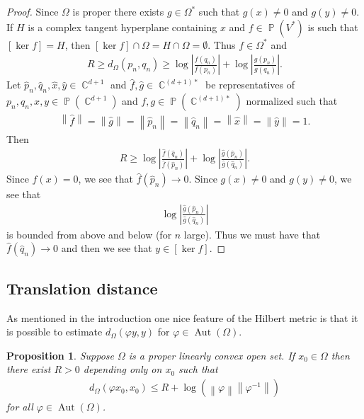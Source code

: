 \documentclass[12pt]{amsart}
\theoremstyle{plain}
\newtheorem{proposition}{Proposition}[section]
\theoremstyle{definition}
\theoremstyle{remark}
\begin{document}
\begin{proof}
Since $\Omega$ is proper there exists $g \in \Omega^*$ such that $g(x) \neq 0$ and $g(y) \neq 0$. If $H$ is a complex tangent hyperplane containing $x$ and $f \in\operatorname{\mathbb{P}}(V^*)$ is such that $[\ker f]=H$, then $[\ker f] \cap \Omega = H \cap \Omega = \emptyset$. Thus $f \in \Omega^*$ and 
\begin{align*}
R \geq d_{\Omega}( p_n, q_n ) \geq \log {\left|{ \frac{f(q_n)}{f(p_n)}}\right|}+\log  {\left|{\frac{g(p_n)}{g(q_n)}}\right|}.
\end{align*}
Let $\hat{p}_n,\hat{q}_n,\hat{x},\hat{y} \in \operatorname{\mathbb{C}}^{d+1}$ and $\hat{f},\hat{g} \in \operatorname{\mathbb{C}}^{(d+1)*}$ be representatives of $p_n,q_n,x,y \in \operatorname{\mathbb{P}}(\operatorname{\mathbb{C}}^{d+1})$ and $f,g \in \operatorname{\mathbb{P}}(\operatorname{\mathbb{C}}^{(d+1)*})$ normalized such that 
\begin{align*}
{\left\|{\hat{f}}\right\|}={\left\|{\hat{g}}\right\|}={\left\|{\hat{p}_n}\right\|}={\left\|{\hat{q}_n}\right\|}={\left\|{\hat{x}}\right\|}={\left\|{\hat{y}}\right\|}=1.
\end{align*}
Then 
\begin{align*}
R \geq \log {\left|{\frac{\hat{f}(\hat{q}_n)}{\hat{f}(\hat{p}_n)}}\right|}+\log {\left|{ \frac{\hat{g}(\hat{p}_n)}{\hat{g}(\hat{q}_n)}}\right|}.
\end{align*}
Since $f(x)=0$, we see that $\hat{f}(\hat{p}_n) \rightarrow 0$. Since $g(x) \neq 0$ and $g(y) \neq 0$, we see that 
\begin{align*}
\log  {\left|{\frac{\hat{g}(\hat{p}_n)}{\hat{g}(\hat{q}_n)}}\right|}
\end{align*}
 is bounded from above and below (for $n$ large). Thus we must have that $\hat{f}(\hat{q}_n) \rightarrow 0$ and then we see that $y \in [\ker f]$.
\end{proof}

\subsection{Translation distance} As mentioned in the introduction one nice feature of the Hilbert metric is that it is possible to estimate $d_{\Omega} (\varphi y, y)$ for $\varphi \in \operatorname{Aut}(\Omega)$. 

\begin{proposition}
\label{prop:trans_dist}
Suppose $\Omega$ is a  proper linearly convex open set. If $x_0 \in \Omega$ then there exist $R>0$ depending only on $x_0$ such that 
\begin{align*}
d_{\Omega}(\varphi x_0, x_0) \leq R + \log\left({\left\|{\varphi}\right\|}{\left\|{\varphi^{-1}}\right\|}\right)
\end{align*}
for all $\varphi \in \operatorname{Aut}(\Omega)$.
\end{proposition}
\end{document}
